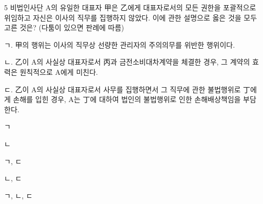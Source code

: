\begin{question}{5}
비법인사단 A의 유일한 대표자 甲은 乙에게 대표자로서의 모든 권한을 포괄적으로 위임하고 자신은 이사의 직무를 집행하지 않았다. 이에 관한 설명으로 옳은 것을 모두 고른 것은? (다툼이 있으면 판례에 따름)
\begin{framedtext}
ㄱ. 甲의 행위는 이사의 직무상 선량한 관리자의 주의의무를 위반한 행위이다. \par
ㄴ. 乙이 A의 사실상 대표자로서 丙과 금전소비대차계약을 체결한 경우, 그 계약의 효력은 원칙적으로 A에게 미친다. \par
ㄷ. 乙이 A의 사실상 대표자로서 사무를 집행하면서 그 직무에 관한 불법행위로 丁에게 손해를 입힌 경우, A는 丁에 대하여 법인의 불법행위로 인한 손해배상책임을 부담한다. \par
\end{framedtext}
\begin{choices}
  \item ㄱ
  \item ㄴ
  \item ㄱ, ㄷ
  \item ㄴ, ㄷ
  \item ㄱ, ㄴ, ㄷ
\end{choices}
\end{question}

